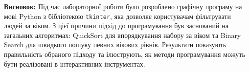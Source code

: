 \documentclass[12pt,a4paper]{article}
\begin{document}
\begin{figure}[htbp]
\begin{subfigure}{0.33\textwidth}
            \label{fig1:d}
        \end{subfigure}

        \label{fig1:grid4}
    \end{figure}

    \textbf{\underline{Висновок:}}
    Під час лабораторної роботи  було розроблено графічну програму на мові Python з бібліотекою \texttt{tkinter}, яка дозволяє користувачам фільтрувати людей за віком. З цієї причини підхід до програмування був заснований на загальних алгоритмах: QuickSort для впорядкування набору за віком та Binary Search для швидкого пошуку певних вікових рівнів.
    Результати показують правильність обраного підходу та ілюструють, як методи програмування можуть бути реалізовані в інтерактивних інструментах.
\end{document}
